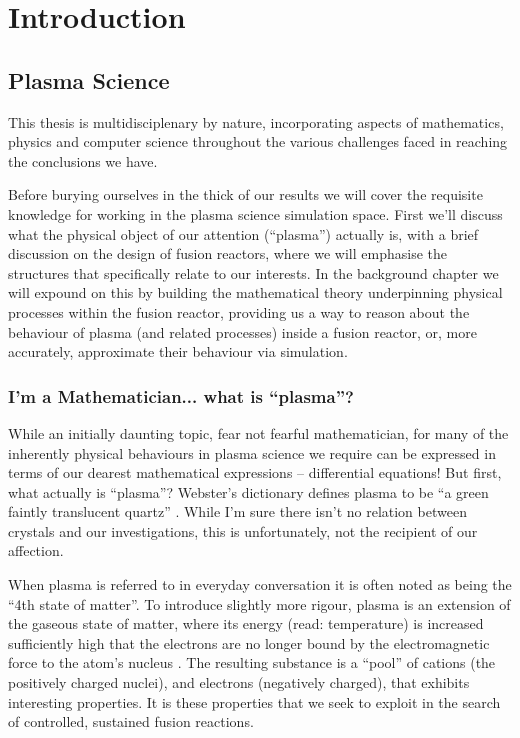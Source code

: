 
\chapter{Introduction}
\label{chapter1}

\section{Plasma Science}

This thesis is multidisciplenary by nature, incorporating aspects of mathematics, physics and computer science throughout 
the various challenges faced in reaching the conclusions we have. 


Before burying ourselves in the thick of our results we 
will cover the requisite knowledge for working in the plasma science simulation space. First we'll discuss what 
the physical object of our attention (``plasma'') actually is, with a brief discussion on the design of fusion reactors, where we will 
emphasise the structures that specifically relate to our interests. In the background chapter we will expound on this by 
building the mathematical theory underpinning physical processes within the fusion reactor, providing us a way to reason
about the behaviour of plasma (and related processes) inside a fusion reactor, or, more accurately, approximate their behaviour 
via simulation.




\subsection{I'm a Mathematician... what is ``plasma''?}

While an initially daunting topic, fear not fearful mathematician, for many of the inherently physical 
behaviours in plasma science we require can be expressed in terms of our dearest mathematical expressions -- differential equations! 
But first, what actually is ``plasma''? Webster's dictionary defines plasma to be ``a green faintly translucent quartz'' \cite{websters_plasma}. 
While I'm sure there isn't no relation between crystals and our investigations, this is unfortunately, not the recipient of our affection. 

When plasma is referred to in everyday conversation it is often noted as being the ``4th state of matter''. To introduce slightly more rigour,
plasma is an extension of the gaseous state of matter, where its energy (read: temperature) is increased sufficiently high that the electrons 
are no longer bound by the electromagnetic force to the atom's nucleus . The resulting substance is a ``pool'' of cations (the positively charged nuclei), and 
electrons (negatively charged), that exhibits interesting properties. It is these properties that we seek to exploit in the search of controlled, 
sustained fusion reactions.

